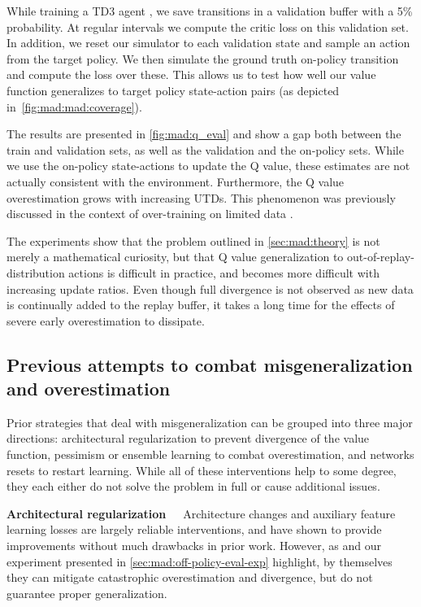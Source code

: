 While training a TD3 agent \parencite{fujimoto2018addressing}, we save transitions in a validation buffer with a 5\% probability.
At regular intervals we compute the critic loss on this validation set.
In addition, we reset our simulator to each validation state and sample an action from the target policy.
We then simulate the ground truth on-policy transition and compute the loss over these.
This allows us to test how well our value function generalizes to target policy state-action pairs (as depicted in~\autoref{fig:mad:mad:coverage}).

The results are presented in \autoref{fig:mad:q_eval} and show a gap both between the train and validation sets, as well as the validation and the on-policy sets.
While we use the on-policy state-actions to update the Q value, these estimates are not actually consistent with the environment.
Furthermore, the Q value overestimation grows with increasing UTDs.
This phenomenon was previously discussed in the context of over-training on limited data \parencite{hussing2024dissecting} .

The experiments show that the problem outlined in \autoref{sec:mad:theory} is not merely a mathematical curiosity, but that Q value generalization to out-of-replay-distribution actions is difficult in practice, and becomes more difficult with increasing update ratios.
Even though full divergence is not observed as new data is continually added to the replay buffer, it takes a long time for the effects of severe early overestimation to dissipate.

\subsection{Previous attempts to combat misgeneralization and overestimation}
\label{sec:mad:prior}
Prior strategies that deal with misgeneralization can be grouped into three major directions: architectural regularization to prevent divergence of the value function, pessimism or ensemble learning to combat overestimation, and networks resets to restart learning.
While all of these interventions help to some degree, they each either do not solve the problem in full or cause additional issues.

\textbf{Architectural regularization}~~~Architecture changes \parencite{hussing2024dissecting,nauman2024overestimation,nauman2024bigger,lyle2024disentangling} and auxiliary feature learning losses \parencite{schwarzer2021dataefficient,zhao2023simplified,ni2024bridging,voelcker2024when} are largely reliable interventions, and have shown to provide improvements without much drawbacks in prior work.
However, as \textcite{hussing2024dissecting} and our experiment presented in \autoref{sec:mad:off-policy-eval-exp} highlight, by themselves they can mitigate catastrophic overestimation and divergence, but do not guarantee proper generalization. %

